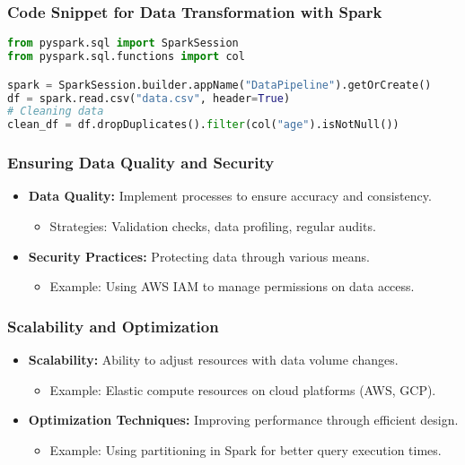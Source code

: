 \documentclass[aspectratio=169]{beamer}
\begin{document}
\begin{frame}[fragile]
    \frametitle{Code Snippet for Data Transformation with Spark}
    \begin{lstlisting}[language=python]
from pyspark.sql import SparkSession
from pyspark.sql.functions import col

spark = SparkSession.builder.appName("DataPipeline").getOrCreate()
df = spark.read.csv("data.csv", header=True)
# Cleaning data
clean_df = df.dropDuplicates().filter(col("age").isNotNull())
    \end{lstlisting}
\end{frame}

\begin{frame}
    \frametitle{Ensuring Data Quality and Security}
    \begin{itemize}
        \item \textbf{Data Quality:} Implement processes to ensure accuracy and consistency.
        \begin{itemize}
            \item Strategies: Validation checks, data profiling, regular audits.
        \end{itemize}
        
        \item \textbf{Security Practices:} Protecting data through various means.
        \begin{itemize}
            \item Example: Using AWS IAM to manage permissions on data access.
        \end{itemize}
    \end{itemize}
\end{frame}

\begin{frame}
    \frametitle{Scalability and Optimization}
    \begin{itemize}
        \item \textbf{Scalability:} Ability to adjust resources with data volume changes.
        \begin{itemize}
            \item Example: Elastic compute resources on cloud platforms (AWS, GCP).
        \end{itemize}
        
        \item \textbf{Optimization Techniques:} Improving performance through efficient design.
        \begin{itemize}
            \item Example: Using partitioning in Spark for better query execution times.
        \end{itemize}
    \end{itemize}
\end{frame}
\end{document}
